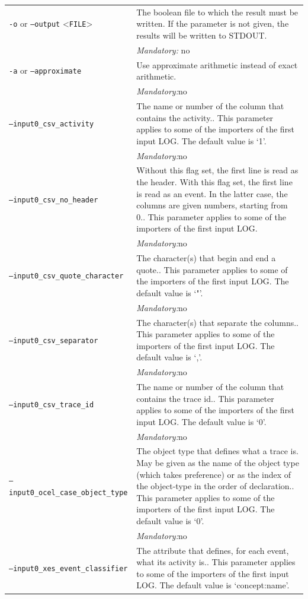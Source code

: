 {\begin{tabularx}{\linewidth}{lX}
\texttt{-o} or \texttt{--output} <\texttt{FILE}> &
The boolean file to which the result must be written. If the parameter is not given, the results will be written to STDOUT.\\
&\textit{Mandatory:} \quad no\\
\texttt{-a} or \texttt{--approximate} & Use approximate arithmetic instead of exact arithmetic.\\
&\textit{Mandatory:}\quad no\\
\texttt{--input0\_csv\_activity} & The name or number of the column that contains the activity.. This parameter applies to some of the importers of the first input LOG. The default value is `1'.\\
&\textit{Mandatory:}\quad no\\
\texttt{--input0\_csv\_no\_header} & Without this flag set, the first line is read as the header. 
    With this flag set, the first line is read as an event. In the latter case, the columns are given numbers, starting from 0.. This parameter applies to some of the importers of the first input LOG. \\
&\textit{Mandatory:}\quad no\\
\texttt{--input0\_csv\_quote\_character} & The character(s) that begin and end a quote.. This parameter applies to some of the importers of the first input LOG. The default value is `"'.\\
&\textit{Mandatory:}\quad no\\
\texttt{--input0\_csv\_separator} & The character(s) that separate the columns.. This parameter applies to some of the importers of the first input LOG. The default value is `,'.\\
&\textit{Mandatory:}\quad no\\
\texttt{--input0\_csv\_trace\_id} & The name or number of the column that contains the trace id.. This parameter applies to some of the importers of the first input LOG. The default value is `0'.\\
&\textit{Mandatory:}\quad no\\
\texttt{--input0\_ocel\_case\_object\_type} & The object type that defines what a trace is. May be given as the name of the object type (which takes preference) or as the index of the object-type in the order of declaration.. This parameter applies to some of the importers of the first input LOG. The default value is `0'.\\
&\textit{Mandatory:}\quad no\\
\texttt{--input0\_xes\_event\_classifier} & The attribute that defines, for each event, what its activity is.. This parameter applies to some of the importers of the first input LOG. The default value is `concept:name'.\\

\end{tabularx}}
